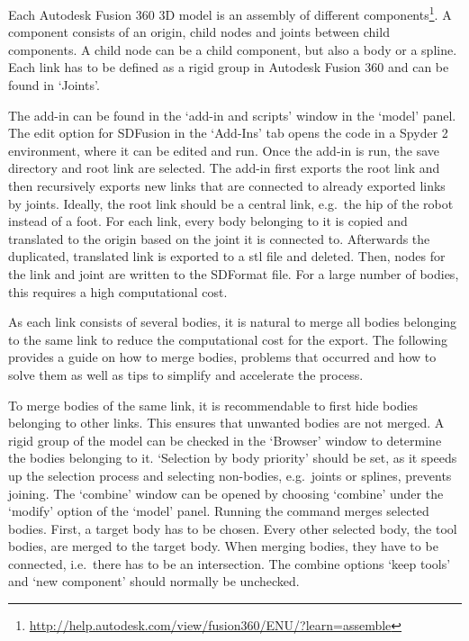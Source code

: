 
Each Autodesk Fusion 360 3D model is an assembly of different components\footnote{\url{http://help.autodesk.com/view/fusion360/ENU/?learn=assemble}}. A component consists of an origin, child nodes and joints between child components. A child node can be a child component, but also a body or a spline. Each link has to be defined as a rigid group in Autodesk Fusion 360 and can be found in `Joints'.

The add-in can be found in the `add-in and scripts' window in the ‘model’ panel.  The edit option for SDFusion in the `Add-Ins' tab opens the code in a Spyder 2 environment, where it can be edited and run. Once the add-in is run, the save directory and root link are selected. The add-in first exports the root link and then recursively exports new links that are connected to already exported links by joints. Ideally, the root link should be a central link, e.g.\ the hip of the robot instead of a foot. For each link, every body belonging to it is copied and translated to the origin based on the joint it is connected to. Afterwards the duplicated, translated link is exported to a stl file and deleted. Then, nodes for the link and joint are written to the SDFormat file. For a large number of bodies, this requires a high computational cost.
 
As each link consists of several bodies, it is natural to merge all bodies belonging to the same link to reduce the computational cost for the export. The following provides a guide on how to merge bodies, problems that occurred and how to solve them as well as tips to simplify and accelerate the process.

To merge bodies of the same link, it is recommendable to first hide bodies belonging to other links. This ensures that unwanted bodies are not merged. A rigid group of the model can be checked in the ‘Browser’ window to determine the bodies belonging to it. `Selection by body priority' should be set, as it speeds up the selection process and selecting non-bodies, e.g.\ joints or splines, prevents joining. The ‘combine’ window can be opened by choosing `combine' under the ‘modify’ option of the ‘model’ panel. Running the command merges selected bodies. First, a target body has to be chosen. Every other selected body, the tool bodies, are merged to the target body. When merging bodies, they have to be connected, i.e.\ there has to be an intersection. The combine options ‘keep tools’ and ‘new component’ should normally be unchecked.

